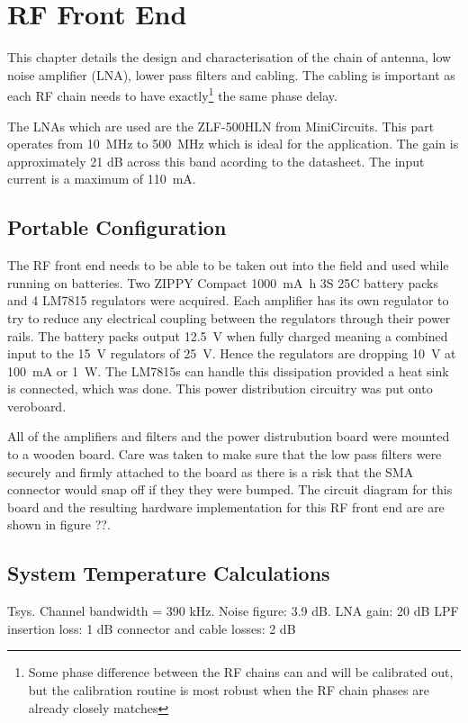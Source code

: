 \chapter{RF Front End}
\label{ch:rf-front-end}
\graphicspath{{./img/rf-front-end/}}

This chapter details the design and characterisation of the chain of antenna, low noise amplifier (LNA), lower pass filters and cabling. The cabling is important as each RF chain needs to have exactly\footnote{Some phase difference between the RF chains can and will be calibrated out, but the calibration routine is most robust when the RF chain phases are already closely matches} the same phase delay.

The LNAs which are used are the ZLF-500HLN from MiniCircuits. This part operates from \SI{10}{\mega\hertz} to \SI{500}{\mega\hertz} which is ideal for the application. The gain is approximately 21 dB across this band acording to the datasheet. The input current is a maximum of \SI{110}{\milli\ampere}.

\section{Portable Configuration}
The RF front end needs to be able to be taken out into the field and used while running on batteries.
Two ZIPPY Compact \SI{1000}{\milli\ampere\hour} 3S 25C battery packs and 4 LM7815 regulators were acquired. 
Each amplifier has its own regulator to try to reduce any electrical coupling between the regulators through their power rails.
The battery packs output \SI{12.5}{\volt} when fully charged meaning a combined input to the \SI{15}{\volt} regulators of \SI{25}{\volt}. Hence the regulators are dropping \SI{10}{\volt} at \SI{100}{\milli\ampere} or \SI{1}{\watt}.
The LM7815s can handle this dissipation provided a heat sink is connected, which was done.
This power distribution circuitry was put onto veroboard.

All of the amplifiers and filters and the power distrubution board were mounted to a wooden board.
Care was taken to make sure that the low pass filters were securely and firmly attached to the board as there is a risk that the SMA connector would snap off if they they were bumped. 
The circuit diagram for this board and the resulting hardware implementation for this RF front end are are shown in figure ??.

\section{System Temperature Calculations}
Tsys.
Channel bandwidth = 390 kHz. 
Noise figure: 3.9 dB. 
LNA gain: 20 dB
LPF insertion loss: 1 dB
connector and cable losses: 2 dB

